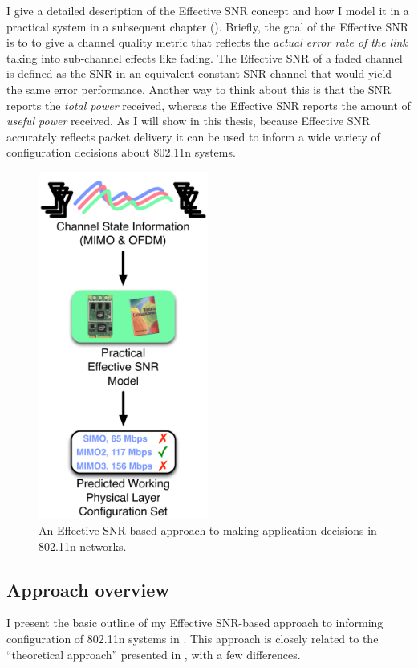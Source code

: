I give a detailed description of the Effective SNR concept and how I model it in a practical system in a subsequent chapter (). Briefly, the goal of the Effective SNR is to to give a channel quality metric that reflects the \emph{actual error rate of the link} taking into sub-channel effects like fading. The Effective SNR of a faded channel is defined as the SNR in an equivalent constant-SNR channel that would yield the same error performance. Another way to think about this is that the SNR reports the \emph{total power} received, whereas the Effective SNR reports the amount of \emph{useful power} received. As I will show in this thesis, because Effective SNR accurately reflects packet delivery it can be used to inform a wide variety of configuration decisions about 802.11n systems.

\begin{figure}[t]
	\centering
	\includegraphics[width=2.2in]{figures/selection_esnr}
	\caption{\label{fig:selection_esnr}An Effective SNR-based approach to making application decisions in 802.11n networks.}
\end{figure}

\subsection{Approach overview}
I present the basic outline of my Effective SNR-based approach to informing configuration of 802.11n systems in . This approach is closely related to the ``theoretical approach'' presented in , with a few differences.

